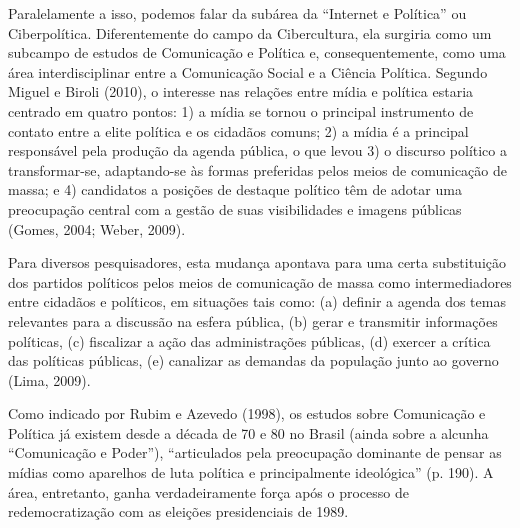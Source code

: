 Paralelamente a isso, podemos falar da subárea da ``Internet e
Política'' ou Ciberpolítica. Diferentemente do campo da Cibercultura,
ela surgiria como um subcampo de estudos de Comunicação e Política e,
consequentemente, como uma área interdisciplinar entre a Comunicação
Social e a Ciência Política. Segundo Miguel e Biroli (2010), o interesse
nas relações entre mídia e política estaria centrado em quatro pontos:
1) a mídia se tornou o principal instrumento de contato entre a elite
política e os cidadãos comuns; 2) a mídia é a principal responsável pela
produção da agenda pública, o que levou 3) o discurso político a
transformar-se, adaptando-se às formas preferidas pelos meios de
comunicação de massa; e 4) candidatos a posições de destaque político
têm de adotar uma preocupação central com a gestão de suas visibilidades
e imagens públicas (Gomes, 2004; Weber, 2009).

Para diversos pesquisadores, esta mudança apontava para uma certa
substituição dos partidos políticos pelos meios de comunicação de massa
como intermediadores entre cidadãos e políticos, em situações tais como:
(a) definir a agenda dos temas relevantes para a discussão na esfera
pública, (b) gerar e transmitir informações políticas, (c) fiscalizar a
ação das administrações públicas, (d) exercer a crítica das políticas
públicas, (e) canalizar as demandas da população junto ao governo (Lima,
2009).

Como indicado por Rubim e Azevedo (1998), os estudos sobre Comunicação e
Política já existem desde a década de 70 e 80 no Brasil (ainda sobre a
alcunha ``Comunicação e Poder''), ``articulados pela preocupação
dominante de pensar as mídias como aparelhos de luta política e
principalmente ideológica'' (p. 190). A área, entretanto, ganha
verdadeiramente força após o processo de redemocratização com as
eleições presidenciais de 1989.

